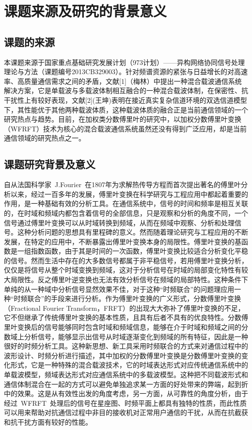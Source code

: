 
\section{课题来源及研究的背景意义}
\subsection{课题的来源}

本课题来源于国家重点基础研究发展计划（973计划）——异构网络协同信号处理理论与方法（课题编号2013CB329003）。针对频谱资源的紧张与日益增长的对高速率、高质量通信需求之间的矛盾，文献[1]（梅林）中提出一种混合载波通信系统解决方案，它是单载波与多载波体制相互融合的一种混合载波体制，在保密性、抗干扰性上有较好表现，文献[2](王坤)表明在接近真实复杂信道环境的双选信道模型下，其性能优于其他两种载波体质，这种载波体质的融合正是当前通信领域的一个研究热点与趋势。目前，在加权类分数傅里叶的研究中，以加权分数傅里叶变换（WFRFT）技术为核心的混合载波通信系统虽然还没有得到广泛应用，却是当前通信领域的研究热点之一。


\subsection{课题研究背景及意义}

自从法国科学家~J.Fourier~在1807年为求解热传导方程而首次提出著名的傅里叶分析以来，经过一百多年的发展，傅里叶变换在科学研究与工程应用中都起着重要的作用，是一种基础有效的分析工具。在通信系统中，信号的时间和频率是相互关联的，在时域和频域内都包含着信号的全部信息，只是观察和分析的角度不同，一个信号通过傅里叶变换可以从时域转换到频域，从而在频域中观察、分析和处理信号。这种分析问题的思想具有里程碑的意义。然而随着理论研究与工程应用的不断发展，在特定的应用中，不断暴露出傅里叶变换本身的局限性。傅里叶变换的基函数是一组指数函数，由于其是时间的一次函数，傅里叶变换比较适合分析变化平稳的信号。然而生活中存在的大多数信号都属于非平稳信号，若用傅里叶变换分析，仅仅是将信号从整个时域变换到频域，这对于分析信号在时域的局部变化特性有较大局限性。反之傅里叶逆变换也无法有效分析信号在频域的局部特性。这种条件下单纯的从一种域中分析信号显然效果不佳，对于这种“时频联合”的问题理应用一种“时频联合”的手段来进行分析。作为傅里叶变换的广义形式，分数傅里叶变换（Fractional Fourier Transform，FRFT）的出现大大弥补了傅里叶变换的不足，它不但继承了传统傅里叶变换的基本性质，且具有后者不具有的优良特性。分数傅里叶变换后的信号能够同时包含时域和频域信息，能够在介于时域和频域之间的分数域上分析信号，能够显示出信号从时域逐渐变化到频域的所有特征，因此是一种很好的时频分析工具。这种新思想、新工具采用时频联合的方式来对通信过程中的波形设计、时频分析进行描述，其中加权的分数傅里叶变换是分数傅里叶变换的变化形式，它是一种特殊的混合载波技术，它的时域表达形式对应传统通信系统中的单载波模型，频域表达形式对应通信系统中的多载波模型。这种把不同载波形式和通信体制混合在一起的方式可以避免单独追求某一方面的好处带来的弊端，起到折中的效果。这是从有效性出发的角度考虑，另一方面，从可靠性的角度分析，由于经过~WFRFT~处理后的信号在星座图、时频平面上都具有独特的性质，而此性质可以用来帮助对抗通信过程中非目的接收机对正常用户通信的干扰，从而在抗截获和抗干扰方面有较好的性能。

